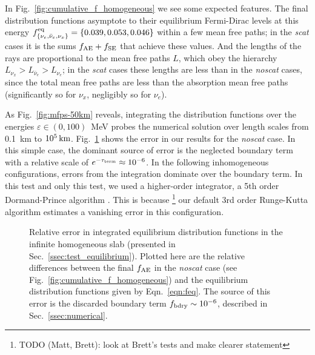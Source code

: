 \documentclass[aps,floatfix,prd,superscriptaddress,twocolumn]{revtex4-1}
\begin{document}
In Fig.~\ref{fig:cumulative_f_homogeneous} we see some expected features.
The final distribution functions asymptote to their equilibrium Fermi-Dirac
levels at this energy
$f^{\rm eq}_{\{\nu_e,\bar{\nu}_e,\nu_x\}}=\{0.039, 0.053, 0.046\}$
within a few mean free paths;
in the \emph{scat} cases it is the sums $f_{\rm AE}+f_{\rm SE}$ that
achieve these values.
And the lengths of the rays are proportional to the mean free paths $L$,
which obey the hierarchy $L_{\nu_x}>L_{\bar{\nu}_e}>L_{\nu_e}$;
in the \emph{scat} cases these lengths are less than in the \emph{noscat} cases,
since the total mean free paths are less than the absorption mean free paths
(significantly so for $\nu_x$, negligibly so for $\nu_e$).

As Fig.~\ref{fig:mfps-50km} reveals, integrating the distribution functions
over the energies $\varepsilon\in(0,100)$~MeV
probes the numerical solution over length scales from
0.1~km to $10^{5}\,{\rm km}$.
Fig.~\ref{fig:homogeneous_isotropic} shows the error in our results for
the \emph{noscat} case.
In this simple case, the dominant source of error is the neglected
boundary term with a relative scale of $e^{-\tau_{\rm term}}\approx10^{-6}$.
In the following inhomogeneous configurations,
errors from the integration dominate over the boundary term.
In this test and only this test, we used a higher-order integrator, a 5th
order Dormand-Prince algorithm \cite{pres2007-nr_3rd_ed}. This is because
\footnote{TODO (Matt, Brett): look at Brett's tests and make clearer statement}
our default 3rd order Runge-Kutta algorithm estimates a vanishing error
in this configuration.

\begin{figure}
  \resizebox{\columnwidth}{!}{}
  \caption{Relative error in integrated equilibrium distribution functions
    in the infinite homogeneous slab
    (presented in Sec.~\ref{ssec:test_equilibrium}).
    Plotted here are the relative differences between the final
    $f_{\rm AE}$ in the \emph{noscat} case
    (see Fig.~\ref{fig:cumulative_f_homogeneous})
    and the equilibrium distribution functions given by
    Eqn.~\ref{eqn:feq}.
    The source of this error is the discarded boundary term
    $f_{\rm bdry}\sim10^{-6}$, described in Sec.~\ref{ssec:numerical}.
  }
  \label{fig:homogeneous_isotropic}
\end{figure}
\end{document}
